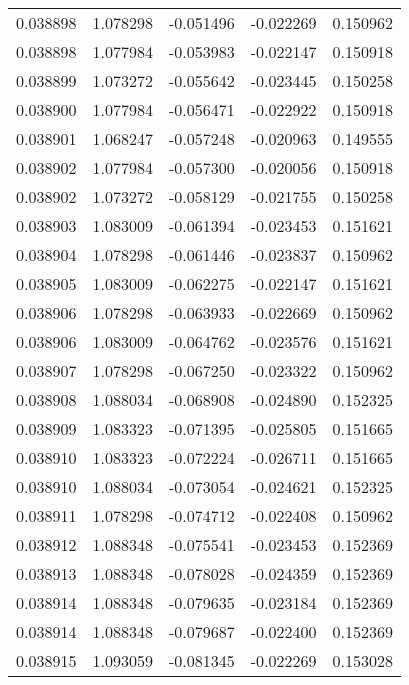 \begin{tabular}{lrrrr}
0.038898    &  1.078298 & -0.051496 & -0.022269 &             0.150962 \\
0.038898    &  1.077984 & -0.053983 & -0.022147 &             0.150918 \\
0.038899    &  1.073272 & -0.055642 & -0.023445 &             0.150258 \\
0.038900    &  1.077984 & -0.056471 & -0.022922 &             0.150918 \\
0.038901    &  1.068247 & -0.057248 & -0.020963 &             0.149555 \\
0.038902    &  1.077984 & -0.057300 & -0.020056 &             0.150918 \\
0.038902    &  1.073272 & -0.058129 & -0.021755 &             0.150258 \\
0.038903    &  1.083009 & -0.061394 & -0.023453 &             0.151621 \\
0.038904    &  1.078298 & -0.061446 & -0.023837 &             0.150962 \\
0.038905    &  1.083009 & -0.062275 & -0.022147 &             0.151621 \\
0.038906    &  1.078298 & -0.063933 & -0.022669 &             0.150962 \\
0.038906    &  1.083009 & -0.064762 & -0.023576 &             0.151621 \\
0.038907    &  1.078298 & -0.067250 & -0.023322 &             0.150962 \\
0.038908    &  1.088034 & -0.068908 & -0.024890 &             0.152325 \\
0.038909    &  1.083323 & -0.071395 & -0.025805 &             0.151665 \\
0.038910    &  1.083323 & -0.072224 & -0.026711 &             0.151665 \\
0.038910    &  1.088034 & -0.073054 & -0.024621 &             0.152325 \\
0.038911    &  1.078298 & -0.074712 & -0.022408 &             0.150962 \\
0.038912    &  1.088348 & -0.075541 & -0.023453 &             0.152369 \\
0.038913    &  1.088348 & -0.078028 & -0.024359 &             0.152369 \\
0.038914    &  1.088348 & -0.079635 & -0.023184 &             0.152369 \\
0.038914    &  1.088348 & -0.079687 & -0.022400 &             0.152369 \\
0.038915    &  1.093059 & -0.081345 & -0.022269 &             0.153028 \\

\end{tabular}
